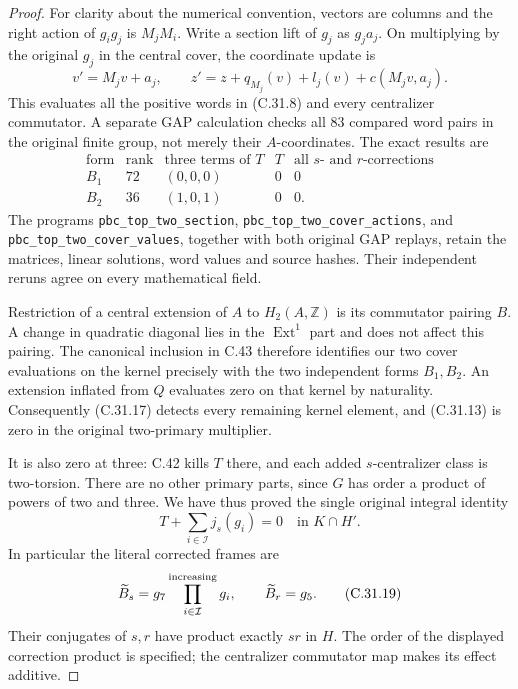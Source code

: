 \begin{proof}
For clarity about the numerical convention, vectors are columns
and the right action of $g_i g_j$ is $M_jM_i$. Write a section lift
of $g_j$ as $g_j a_j$. On multiplying by the original $g_j$ in the
central cover, the coordinate update is
\[
 v'=M_jv+a_j,\qquad
 z'=z+q_{M_j}(v)+l_j(v)+c(M_jv,a_j).
 \tag{C.31.16}
\]
This evaluates all the positive words in (C.31.8) and every
centralizer commutator. A separate GAP calculation checks all
$83$ compared word pairs in the original finite group, not merely
their $A$-coordinates. The exact results are
\[
\begin{array}{c|c|c|c|c}
 \text{form}&\text{rank}&\text{three terms of }T&T&
             \text{all }s\text{- and }r\text{-corrections}\\\hline
 B_1&72&(0,0,0)&0&0\\
 B_2&36&(1,0,1)&0&0.
\end{array}
 \tag{C.31.17}
\]
The programs \texttt{pbc\_\allowbreak top\_\allowbreak two\_\allowbreak section},
\texttt{pbc\_\allowbreak top\_\allowbreak two\_\allowbreak cover\_\allowbreak actions}, and
\texttt{pbc\_\allowbreak top\_\allowbreak two\_\allowbreak cover\_\allowbreak values}, together with both original
GAP replays, retain the matrices, linear solutions, word values and
source hashes. Their independent reruns agree on every mathematical
field.

Restriction of a central extension of $A$ to $H_2(A,\mathbb Z)$
is its commutator pairing $B$. A change in quadratic diagonal lies
in the $\operatorname{Ext}^1$ part and does not affect this pairing.
The canonical inclusion in C.43 therefore identifies our two
cover evaluations on the kernel precisely with the two independent
forms $B_1,B_2$. An extension inflated from $Q$ evaluates zero on
that kernel by naturality. Consequently (C.31.17) detects every
remaining kernel element, and (C.31.13) is zero in the original
two-primary multiplier.

It is also zero at three: C.42 kills $T$ there, and each added
$s$-centralizer class is two-torsion. There are no other primary
parts, since $G$ has order a product of powers of two and three.
We have thus proved the single original integral identity
\[
                    T+\sum_{i\in\mathcal I}j_s(g_i)=0
                         \quad\text{in }K\cap H'.
 \tag{C.31.18}
\]
In particular the literal corrected frames are
\[
        \widetilde B_s=g_7\prod_{i\in\mathcal I}^{\rm increasing}g_i,
        \qquad \widetilde B_r=g_5.
 \tag{C.31.19}
\]
Their conjugates of $s,r$ have product exactly $sr$ in $H$.
The order of the displayed correction product is specified; the
centralizer commutator map makes its effect additive.


\end{proof}
